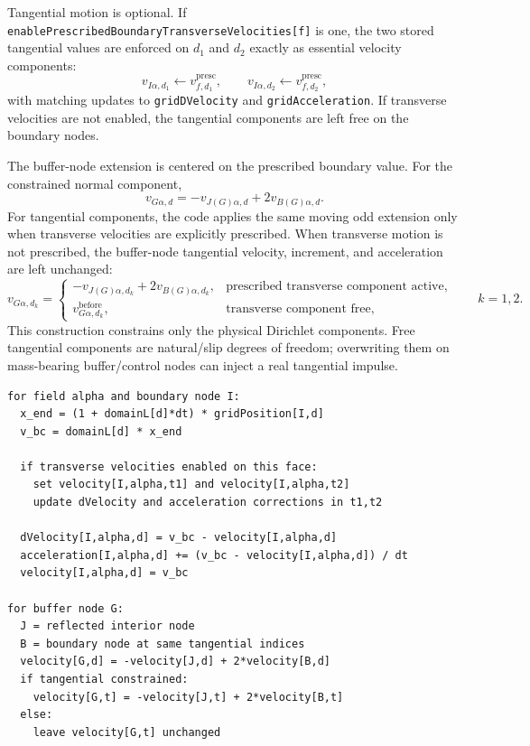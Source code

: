 Tangential motion is optional.  If \texttt{enablePrescribedBoundaryTransverseVelocities[f]} is one, the two stored tangential values are enforced on $d_1$ and $d_2$ exactly as essential velocity components:
\begin{equation}
  v_{I\alpha,d_1}\leftarrow v_{f,d_1}^{\mathrm{presc}},
  \qquad
  v_{I\alpha,d_2}\leftarrow v_{f,d_2}^{\mathrm{presc}},
  \label{eq:bc-moving-transverse}
\end{equation}
with matching updates to \texttt{gridDVelocity} and \texttt{gridAcceleration}.  If transverse velocities are not enabled, the tangential components are left free on the boundary nodes.

The buffer-node extension is centered on the prescribed boundary value.  For the constrained normal component,
\begin{equation}
  v_{G\alpha,d}=-v_{J(G)\alpha,d}+2v_{B(G)\alpha,d}.
  \label{eq:bc-moving-buffer-normal}
\end{equation}
For tangential components, the code applies the same moving odd extension only when transverse velocities are explicitly prescribed.  When transverse motion is not prescribed, the buffer-node tangential velocity, increment, and acceleration are left unchanged:
\begin{equation}
  v_{G\alpha,d_k}=\begin{cases}
    -v_{J(G)\alpha,d_k}+2v_{B(G)\alpha,d_k}, & \text{prescribed transverse component active},\\
    v_{G\alpha,d_k}^{\mathrm{before}}, & \text{transverse component free},
  \end{cases}
  \qquad k=1,2.
  \label{eq:bc-moving-buffer-tangent}
\end{equation}
This construction constrains only the physical Dirichlet components.  Free tangential components are natural/slip degrees of freedom; overwriting them on mass-bearing buffer/control nodes can inject a real tangential impulse.

\begin{lstlisting}[caption={Moving-face enforcement.}]
for field alpha and boundary node I:
  x_end = (1 + domainL[d]*dt) * gridPosition[I,d]
  v_bc = domainL[d] * x_end

  if transverse velocities enabled on this face:
    set velocity[I,alpha,t1] and velocity[I,alpha,t2]
    update dVelocity and acceleration corrections in t1,t2

  dVelocity[I,alpha,d] = v_bc - velocity[I,alpha,d]
  acceleration[I,alpha,d] += (v_bc - velocity[I,alpha,d]) / dt
  velocity[I,alpha,d] = v_bc

for buffer node G:
  J = reflected interior node
  B = boundary node at same tangential indices
  velocity[G,d] = -velocity[J,d] + 2*velocity[B,d]
  if tangential constrained:
    velocity[G,t] = -velocity[J,t] + 2*velocity[B,t]
  else:
    leave velocity[G,t] unchanged
\end{lstlisting}


